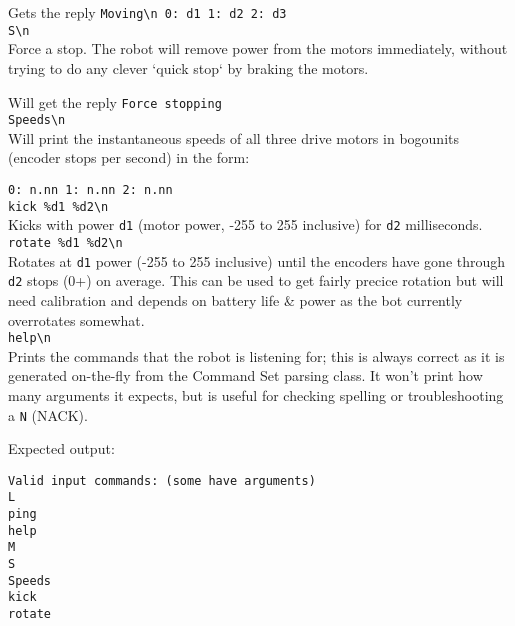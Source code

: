 Gets the reply \verb|Moving\n 0: d1 1: d2 2: d3|\\


\verb|S\n|\\
Force a stop. The robot will remove power from the motors immediately, without trying to do any clever `quick stop` by braking the motors.

Will get the reply \verb|Force stopping|\\


\verb|Speeds\n|\\
Will print the instantaneous speeds of all three drive motors in bogounits (encoder stops per second) in the form:

\verb|0: n.nn 1: n.nn 2: n.nn|\\


\verb|kick %d1 %d2\n|\\
Kicks with power \texttt{d1} (motor power, -255 to 255 inclusive) for \texttt{d2} milliseconds.\\


\verb|rotate %d1 %d2\n|\\
Rotates at \texttt{d1} power (-255 to 255 inclusive) until the encoders have gone through \texttt{d2} stops (0+) on average. This can be used to get fairly precice rotation but will need calibration and depends on battery life \& power as the bot currently overrotates somewhat.\\


\verb|help\n|\\
Prints the commands that the robot is listening for; this is always correct as it is generated on-the-fly from the Command Set parsing class. It won't print how many arguments it expects, but is useful for checking spelling or troubleshooting a \texttt{N} (NACK).

Expected output:

\begin{verbatim}
Valid input commands: (some have arguments)
L
ping
help
M
S
Speeds
kick
rotate
\end{verbatim}
